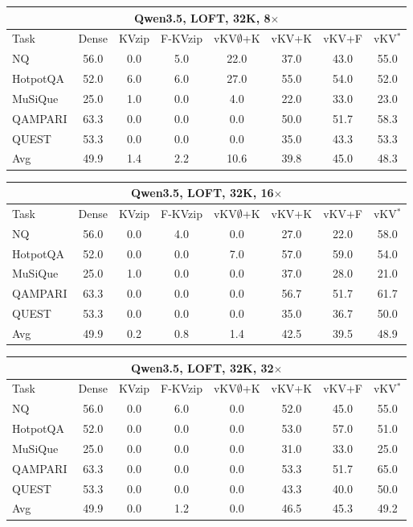\begin{tabular}{lccccccc}
\toprule
\multicolumn{8}{c}{Qwen3.5, LOFT, 32K, 8$\times$} \\
\midrule
Task & Dense & KVzip & F-KVzip & vKV$\emptyset$+K & vKV+K & vKV+F & vKV$^\ast$ \\
\midrule
NQ & 56.0 & 0.0 & 5.0 & 22.0 & 37.0 & 43.0 & 55.0 \\
HotpotQA & 52.0 & 6.0 & 6.0 & 27.0 & 55.0 & 54.0 & 52.0 \\
MuSiQue & 25.0 & 1.0 & 0.0 & 4.0 & 22.0 & 33.0 & 23.0 \\
QAMPARI & 63.3 & 0.0 & 0.0 & 0.0 & 50.0 & 51.7 & 58.3 \\
QUEST & 53.3 & 0.0 & 0.0 & 0.0 & 35.0 & 43.3 & 53.3 \\
\midrule
Avg & 49.9 & 1.4 & 2.2 & 10.6 & 39.8 & 45.0 & 48.3 \\
\bottomrule
\end{tabular}
\vspace{0.8em}

\begin{tabular}{lccccccc}
\toprule
\multicolumn{8}{c}{Qwen3.5, LOFT, 32K, 16$\times$} \\
\midrule
Task & Dense & KVzip & F-KVzip & vKV$\emptyset$+K & vKV+K & vKV+F & vKV$^\ast$ \\
\midrule
NQ & 56.0 & 0.0 & 4.0 & 0.0 & 27.0 & 22.0 & 58.0 \\
HotpotQA & 52.0 & 0.0 & 0.0 & 7.0 & 57.0 & 59.0 & 54.0 \\
MuSiQue & 25.0 & 1.0 & 0.0 & 0.0 & 37.0 & 28.0 & 21.0 \\
QAMPARI & 63.3 & 0.0 & 0.0 & 0.0 & 56.7 & 51.7 & 61.7 \\
QUEST & 53.3 & 0.0 & 0.0 & 0.0 & 35.0 & 36.7 & 50.0 \\
\midrule
Avg & 49.9 & 0.2 & 0.8 & 1.4 & 42.5 & 39.5 & 48.9 \\
\bottomrule
\end{tabular}
\vspace{0.8em}

\begin{tabular}{lccccccc}
\toprule
\multicolumn{8}{c}{Qwen3.5, LOFT, 32K, 32$\times$} \\
\midrule
Task & Dense & KVzip & F-KVzip & vKV$\emptyset$+K & vKV+K & vKV+F & vKV$^\ast$ \\
\midrule
NQ & 56.0 & 0.0 & 6.0 & 0.0 & 52.0 & 45.0 & 55.0 \\
HotpotQA & 52.0 & 0.0 & 0.0 & 0.0 & 53.0 & 57.0 & 51.0 \\
MuSiQue & 25.0 & 0.0 & 0.0 & 0.0 & 31.0 & 33.0 & 25.0 \\
QAMPARI & 63.3 & 0.0 & 0.0 & 0.0 & 53.3 & 51.7 & 65.0 \\
QUEST & 53.3 & 0.0 & 0.0 & 0.0 & 43.3 & 40.0 & 50.0 \\
\midrule
Avg & 49.9 & 0.0 & 1.2 & 0.0 & 46.5 & 45.3 & 49.2 \\
\bottomrule
\end{tabular}
\vspace{0.8em}


